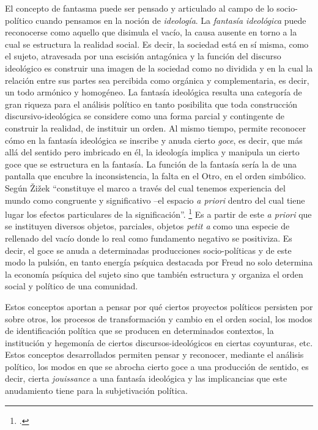 El concepto de fantasma puede ser pensado y articulado al campo de lo socio-político cuando pensamos en la noción de \emph{ideología}. La \emph{fantasía ideológica} puede reconocerse como aquello que disimula el vacío, la causa ausente en torno a la cual se estructura la realidad social. Es decir, la sociedad está en sí misma, como el sujeto, atravesada por una escisión antagónica y la función del discurso ideológico es construir una imagen de la sociedad como no dividida y en la cual la relación entre sus partes sea percibida como orgánica y complementaria, es decir, un todo armónico y homogéneo. La fantasía ideológica resulta una categoría de gran riqueza para el análisis político en tanto posibilita que toda construcción discursivo-ideológica se considere como una forma parcial y contingente de construir la realidad, de instituir un orden. Al mismo tiempo, permite reconocer cómo en la fantasía ideológica se inscribe y anuda cierto \emph{goce}, es decir, que más allá del sentido pero imbricado en él, la ideología implica y manipula un cierto goce que se estructura en la fantasía. La función de la fantasía sería la de una pantalla que encubre la inconsistencia, la falta en el Otro, en el orden simbólico. Según Žižek \enquote{constituye el marco a través del cual tenemos experiencia del mundo como congruente y significativo --el espacio \emph{a priori} dentro del cual tiene lugar los efectos particulares de la significación}. \footcite[][169]{@7111-ZIZEK2003} Es a partir de este \emph{a priori} que se instituyen diversos objetos, parciales, objetos \emph{petit a} como una especie de rellenado del vacío donde lo real como fundamento negativo se positiviza. Es decir, el goce se anuda a determinadas producciones socio-políticas y de este modo la pulsión, en tanto energía psíquica destacada por Freud no solo determina la economía psíquica del sujeto sino que también estructura y organiza el orden social y político de una comunidad.

Estos conceptos aportan a pensar por qué ciertos proyectos políticos persisten por sobre otros, los procesos de transformación y cambio en el orden social, los modos de identificación política que se producen en determinados contextos, la institución y hegemonía de ciertos discursos-ideológicos en ciertas coyunturas, etc. Estos conceptos desarrollados permiten pensar y reconocer, mediante el análisis político, los modos en que se abrocha cierto goce a una producción de sentido, es decir, cierta \emph{jouissance} a una fantasía ideológica y las implicancias que este anudamiento tiene para la subjetivación política.

